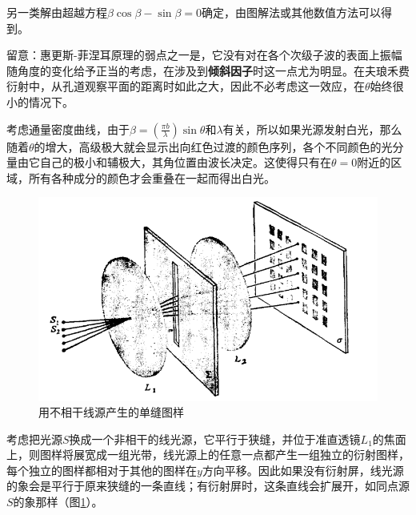 \documentclass[UTF8]{ctexart}
\begin{document}
\noindent 另一类解由超越方程$ \beta \cos \beta-\sin \beta =0 $确定，由图解法或其他数值方法可以得到。

	留意：惠更斯-菲涅耳原理的弱点之一是，它没有对在各个次级子波的表面上振幅随角度的变化给予正当的考虑，在涉及到\textbf{倾斜因子}时这一点尤为明显。在夫琅禾费衍射中，从孔道观察平面的距离时如此之大，因此不必考虑这一效应，在$ \theta $始终很小的情况下。
	
	考虑通量密度曲线，由于$ \beta=\left(\frac{\pi b}{\lambda}\right) \sin \theta $和$ \lambda $有关，所以如果光源发射白光，那么随着$ \theta $的增大，高级极大就会显示出向红色过渡的颜色序列，各个不同颜色的光分量由它自己的极小和辅极大，其角位置由波长决定。这使得只有在$ \theta=0 $附近的区域，所有各种成分的颜色才会重叠在一起而得出白光。
	
	\begin{figure}[ht]
		\centering
		\includegraphics[width=12cm]{Diffraction_non_relevant.png}
		\caption{用不相干线源产生的单缝图样}
		\label{figure_non_relevant}
	\end{figure}

	考虑把光源$ S $换成一个非相干的线光源，它平行于狭缝，并位于准直透镜$ L_{1} $的焦面上，则图样将展宽成一组光带，线光源上的任意一点都产生一组独立的衍射图样，每个独立的图样都相对于其他的图样在$ y $方向平移。因此如果没有衍射屏，线光源的象会是平行于原来狭缝的一条直线；有衍射屏时，这条直线会扩展开，如同点源$ S $的象那样（图\ref{figure_non_relevant}）。
	
\end{document}
